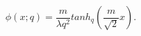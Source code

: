 \begin{equation}
\label{K}
\phi (x;q) = \frac{m}{\lambda q^2}tanh_q\left(\frac{m}{\sqrt 2}x
\right).
\end{equation}

